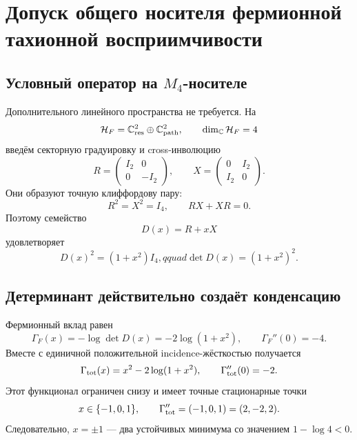 \chapter{Допуск общего носителя фермионной тахионной восприимчивости}
\label{ch:v10-hopf-reservoir-m4-fermion-susceptibility-carrier}

\section{Условный оператор на \texorpdfstring{$M_4$}{M4}-носителе}

Дополнительного линейного пространства не требуется. На
\begin{equation}
 \mathcal H_F=\mathbb C^2_{\rm res}\oplus\mathbb C^2_{\rm path},
 \qquad \dim_{\mathbb C}\mathcal H_F=4
\end{equation}
введём секторную градуировку и cross-инволюцию
\begin{equation}
 R=\begin{pmatrix}I_2&0\\0&-I_2\end{pmatrix},\qquad
 X=\begin{pmatrix}0&I_2\\I_2&0\end{pmatrix}.
\end{equation}
Они образуют точную клиффордову пару:
\begin{equation}
 R^2=X^2=I_4,\qquad RX+XR=0.
\end{equation}
Поэтому семейство
\begin{equation}
 D(x)=R+xX
\end{equation}
удовлетворяет
\begin{equation}
 D(x)^2=(1+x^2)I_4,qquad
 \det D(x)=(1+x^2)^2.
\end{equation}

\section{Детерминант действительно создаёт конденсацию}

Фермионный вклад равен
\begin{equation}
 \Gamma_F(x)=-\log\det D(x)=-2\log(1+x^2),
 \qquad \Gamma_F''(0)=-4.
\end{equation}
Вместе с единичной положительной incidence-жёсткостью получается
\begin{equation}
 \Gamma_{\rm tot}(x)=x^2-2\log(1+x^2),
 \qquad \Gamma_{\rm tot}''(0)=-2.
\end{equation}
Этот функционал ограничен снизу и имеет точные стационарные точки
\begin{equation}
 x\in\{-1,0,1\},\qquad
 \Gamma_{\rm tot}''=(-1,0,1)=(2,-2,2).
\end{equation}
Следовательно, $x=\pm1$ --- два устойчивых минимума со значением
$1-\log4<0$.

